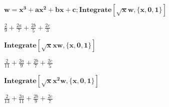 \documentclass{article}
\begin{document}
\begin{doublespace}
\noindent\(\pmb{w=x^3+a x^2+b x+c;\text{Integrate}[\surd x w,\{x,0,1\}]}\)
\end{doublespace}

\begin{doublespace}
\noindent\(\frac{2}{9}+\frac{2 a}{7}+\frac{2 b}{5}+\frac{2 c}{3}\)
\end{doublespace}

\begin{doublespace}
\noindent\(\pmb{\text{Integrate}[\surd x x w,\{x,0,1\}]}\)
\end{doublespace}

\begin{doublespace}
\noindent\(\frac{2}{11}+\frac{2 a}{9}+\frac{2 b}{7}+\frac{2 c}{5}\)
\end{doublespace}

\begin{doublespace}
\noindent\(\pmb{\text{Integrate}\left[\surd x x^2 w,\{x,0,1\}\right]}\)
\end{doublespace}

\begin{doublespace}
\noindent\(\frac{2}{13}+\frac{2 a}{11}+\frac{2 b}{9}+\frac{2 c}{7}\)
\end{doublespace}
\end{document}
